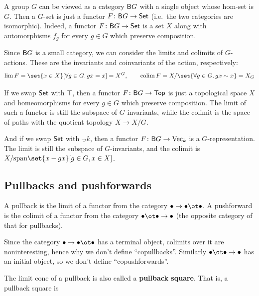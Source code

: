 A group $G$ can be viewed as a category ${\sf B} G$ with a single object whose hom-set is $G$.
Then a $G$-set is just a functor $F\colon{\sf B} G\to{\sf Set}$ (i.e.\ the two categories are isomorphic).
Indeed, a functor $F\colon{\sf B} G\to{\sf Set}$ is a set $X$ along with automorphisms $f_g$ for every $g\in G$ which preserve composition.

Since ${\sf B} G$ is a small category, we can consider the limits and colimits of $G$-actions.
These are the invariants and coinvariants of the action, respectively:
$$ \lim F = \set{x\in X}[\forall g\in G.\,gx=x] = X^G,\qquad \colim F = X/\set{\forall g\in G.\,gx\sim x} = X_G $$

If we swap ${\sf Set}$ with $\top$, then a functor $F\colon{\sf B} G\to{\sf Top}$ is just a topological space $X$ and homeomorphisms for every $g\in G$ which preserve composition.
The limit of such a functor is still the subspace of $G$-invariants, while the colimit is the space of paths with the quotient topology $X\to X/G$.

And if we swap ${\sf Set}$ with $\Vec_k$, then a functor $F\colon{\sf B} G\to{\rm Vec}_k$ is a $G$-representation.
The limit is still the subspace of $G$-invariants, and the colimit is $X/\lspan\set{x-gx}[g\in G,x\in X]$.

\subsection{Pullbacks and pushforwards}

\bdefn

    A {\emphcolor pullback} is the limit of a functor from the category $\bul\to\bul\ot\bul$.
    A {\emphcolor pushforward} is the colimit of a functor from the category $\bul\ot\bul\to\bul$ (the opposite category of that for pullbacks).

\edefn

Since the category $\bul\to\bul\ot\bul$ has a terminal object, colimits over it are noninteresting, hence why we don't define ``copullbacks''.
Similarly $\bul\ot\bul\to\bul$ has an initial object, so we don't define ``copushforwards''.

The limit cone of a pullback is also called a {\bf pullback square}.
That is, a pullback square is

\centerline{}

